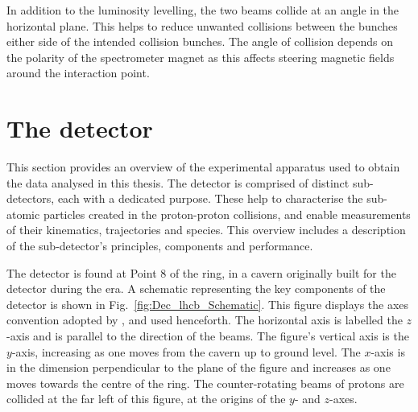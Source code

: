 In addition to the luminosity levelling, the two beams collide at an angle in the horizontal plane. This helps to reduce unwanted collisions between the bunches either side of the intended collision bunches. The angle of collision depends on the polarity of the \lhcb spectrometer magnet as this affects steering magnetic fields around the interaction point. 




\section{The \lhcb detector}

This section provides an overview of the experimental apparatus used to obtain the data analysed in this thesis.
The \lhcb detector is comprised of distinct sub-detectors, each with a dedicated purpose. These help to characterise the sub-atomic particles created in the proton-proton collisions, and enable measurements of their kinematics, trajectories and species.
This overview includes a description of the sub-detector's principles, components and performance. 

The \lhcb detector is found at Point 8 of the \lhc ring, in a cavern originally built for the \delphi detector during the \lep era. A schematic representing the key components of the \lhcb detector is shown in Fig.~\ref{fig:Dec_lhcb_Schematic}. This figure displays the axes convention adopted by \lhcb, and used henceforth. The horizontal axis is labelled the $z$-axis and is parallel to the direction of the beams. The figure's vertical axis is the $y$-axis, increasing as one moves from the cavern up to ground level. The $x$-axis is in the dimension perpendicular to the plane of the figure and increases as one moves towards the centre of the \lhc ring. The counter-rotating beams of protons are collided at the far left of this figure, at the origins of the $y$- and $z$-axes.   

